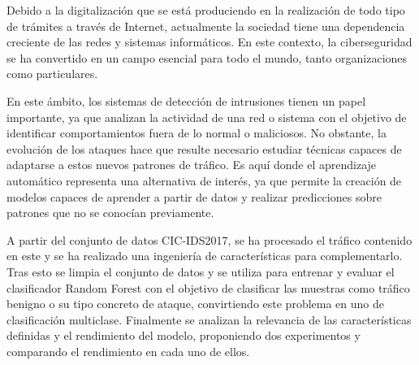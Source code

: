 Debido a la digitalización que se está produciendo en la realización de todo tipo de trámites a través de Internet, actualmente la sociedad tiene una dependencia creciente de las redes y sistemas informáticos. En este contexto, la ciberseguridad se ha convertido en un campo esencial para todo el mundo, tanto organizaciones como particulares.

En este ámbito, los sistemas de detección de intrusiones tienen un papel importante, ya que analizan la actividad de una red o sistema con el objetivo de identificar comportamientos fuera de lo normal o maliciosos. No obstante, la evolución de los ataques hace que resulte necesario estudiar técnicas capaces de adaptarse a estos nuevos patrones de tráfico. Es aquí donde el aprendizaje automático representa una alternativa de interés, ya que permite la creación de modelos capaces de aprender a partir de datos y realizar predicciones sobre patrones que no se conocían previamente.

A partir del conjunto de datos CIC-IDS2017, se ha procesado el tráfico contenido en este y se ha realizado una ingeniería de características para complementarlo. Tras esto se limpia el conjunto de datos y se utiliza para entrenar y evaluar el clasificador Random Forest con el objetivo de clasificar las muestras como tráfico benigno o su tipo concreto de ataque, convirtiendo este problema en uno de clasificación multiclase. Finalmente se analizan la relevancia de las características definidas y el rendimiento del modelo, proponiendo dos experimentos y comparando el rendimiento en cada uno de ellos.


